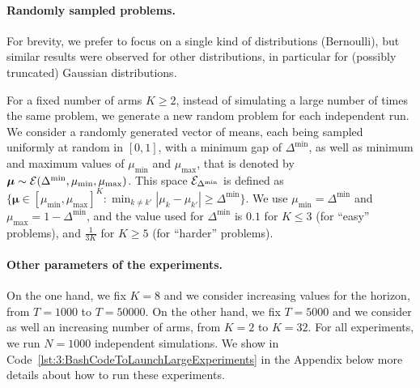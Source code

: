 \paragraph{Randomly sampled problems.}
%
For brevity, we prefer to focus on a single kind of distributions (Bernoulli),
but similar results were observed for other distributions, in particular for (possibly truncated) Gaussian distributions.
%

For a fixed number of arms $K \geq 2$,
instead of simulating a large number of times the same problem,
we generate a new random problem for each independent run.
%
We consider a randomly generated vector of means, each being sampled uniformly at random in $[0,1]$, with a minimum gap of $\Delta^{\min}$, as well as minimum and maximum values of $\mu_{\min}$ and $\mu_{\max}$, that is denoted by $\bm{\mu} \sim \mathcal{E}(\Delta^{\min},\mu_{\min},\mu_{\max})$.
This space $\mathcal{E}_{\Delta^{\min}}$ is defined as $\{ \bm{\mu} \in [\mu_{\min}, \mu_{\max}]^K : \min_{k\neq k'} |\mu_k - \mu_{k'}| \geq \Delta^{\min} \}$.
We use $\mu_{\min} = \Delta^{\min}$ and $\mu_{\max} = 1 - \Delta^{\min}$,
and the value used for $\Delta^{\min}$ is $0.1$ for $K \leq 3$ (for ``easy'' problems), and $\frac{1}{3 K}$ for $K \geq 5$ (for ``harder'' problems).


\paragraph{Other parameters of the experiments.}
%
On the one hand, we fix $K=8$ and we consider increasing values for the horizon, from $T=1000$ to $T=50000$.
On the other hand, we fix $T=5000$ and we consider as well an increasing number of arms, from $K=2$ to $K=32$.
For all experiments, we run $N=1000$ independent simulations.
We show in Code~\ref{lst:3:BashCodeToLaunchLargeExperiments} in the Appendix below more details about how to run these experiments.

